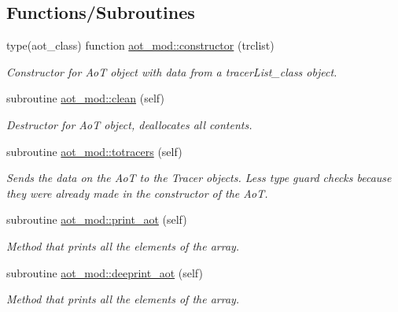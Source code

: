 \subsection*{Functions/\+Subroutines}
\begin{DoxyCompactItemize}
\item 
type(aot\+\_\+class) function \mbox{\hyperlink{namespaceaot__mod_a74ce07a020a7470208360766cfdb12df}{aot\+\_\+mod\+::constructor}} (trclist)
\begin{DoxyCompactList}\small\item\em Constructor for AoT object with data from a tracer\+List\+\_\+class object. \end{DoxyCompactList}\item 
subroutine \mbox{\hyperlink{namespaceaot__mod_a054fca942c27758a0ad6afaa68a3a08e}{aot\+\_\+mod\+::clean}} (self)
\begin{DoxyCompactList}\small\item\em Destructor for AoT object, deallocates all contents. \end{DoxyCompactList}\item 
subroutine \mbox{\hyperlink{namespaceaot__mod_a73ecd8babd54975720741493be733c48}{aot\+\_\+mod\+::totracers}} (self)
\begin{DoxyCompactList}\small\item\em Sends the data on the AoT to the Tracer objects. Less type guard checks because they were already made in the constructor of the AoT. \end{DoxyCompactList}\item 
subroutine \mbox{\hyperlink{namespaceaot__mod_aa6ef0ed7c67e66bf04e7aa0070bbde7f}{aot\+\_\+mod\+::print\+\_\+aot}} (self)
\begin{DoxyCompactList}\small\item\em Method that prints all the elements of the array. \end{DoxyCompactList}\item 
subroutine \mbox{\hyperlink{namespaceaot__mod_a4affda04a7a0278b350231db9cc4ffb8}{aot\+\_\+mod\+::deeprint\+\_\+aot}} (self)
\begin{DoxyCompactList}\small\item\em Method that prints all the elements of the array. \end{DoxyCompactList}\end{DoxyCompactItemize}
